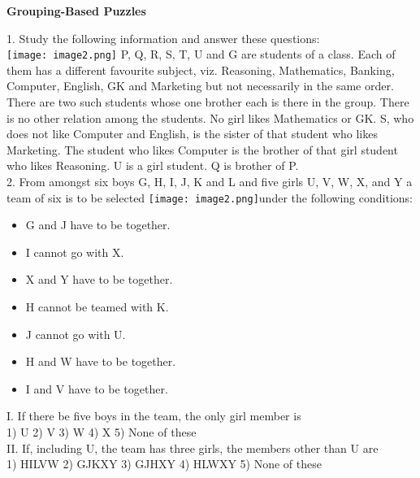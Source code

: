 \documentclass[
]{article}
\author{}
\date{}
\begin{document}
	
 

\begin{center}
	{\Large \textbf{Grouping-Based Puzzles \\}}
\end{center}

1. Study the following information and answer these questions:\\
\texttt{[image: image2.png]}
P, Q, R, S, T, U and G are students of a class. Each of them has a different favourite subject,
viz. Reasoning, Mathematics, Banking, Computer, English, GK and Marketing but not
necessarily in the same order. There are two such students whose one brother each is there
in the group. There is no other relation among the students. No girl likes Mathematics or
GK. S, who does not like Computer and English, is the sister of that student who likes
Marketing. The student who likes Computer is the brother of that girl student who likes
Reasoning. U is a girl student. Q is brother of P.\\

2. From amongst six boys G, H, I, J, K and L and five girls U, V, W, X, and Y a team of six is to
be selected \texttt{[image: image2.png]}under the following conditions:\\
\begin{itemize}
\item G and J have to be together.
\item I cannot go with X.
\item X and Y have to be together.
\item H cannot be teamed with K.
\item J cannot go with U.
\item H and W have to be together.
\item I and V have to be together.
\end{itemize}


I. If there be five boys in the team, the only girl member is\\
1) U \hspace{2mm}2) V \hspace{2mm}3) W \hspace{2mm}4) X \hspace{2mm}5) None of these\\

II. If, including U, the team has three girls, the members other than U are\\
1) HILVW \hspace{2mm}2) GJKXY \hspace{2mm}3) GJHXY \hspace{2mm}4) HLWXY \hspace{2mm}5) None of these\\
\end{document}

